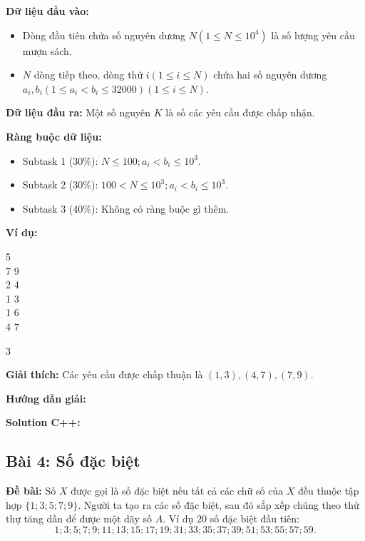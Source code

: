 \documentclass[12pt]{scrartcl}  %
\begin{document}
\textbf{Dữ liệu đầu vào:}
\begin{itemize}
    \item Dòng đầu tiên chứa số nguyên dương $N (1 \leq N \leq 10^4)$ là số lượng yêu cầu mượn sách.
    \item $N$ dòng tiếp theo, dòng thứ $i (1 \leq i \leq N)$ chứa hai số nguyên dương $a_i, b_i (1 \leq a_i < b_i \leq 32000) (1 \leq i \leq N)$. 
\end{itemize}

\textbf{Dữ liệu đầu ra:}
Một số nguyên $K$ là số các yêu cầu được chấp nhận. 

\textbf{Ràng buộc dữ liệu:}
\begin{itemize}
    \item Subtask 1 (30\%): $N \leq 100; a_i < b_i \le 10^3$.
    \item Subtask 2 (30\%): $100 < N \leq 10^3; a_i < b_i \leq 10^3$.
    \item Subtask 3 (40\%): Không có ràng buộc gì thêm.
\end{itemize}

\textbf{Ví dụ:}
\begin{tcolorbox}[colback=gray!5!white, colframe=blue!50!black, title=Input]
5\\
7 9\\
2 4\\
1 3\\
1 6\\
4 7
\end{tcolorbox}
\begin{tcolorbox}[colback=gray!5!white, colframe=green!50!black, title=Output]
3
\end{tcolorbox}

\textbf{Giải thích:}
Các yêu cầu được chấp thuận là $(1, 3), (4, 7), (7, 9)$.

\textbf{Hướng dẫn giải:}

\textbf{Solution C++:}

\subsection{Bài 4: Số đặc biệt}

\textbf{Đề bài:}
Số $X$ được gọi là số đặc biệt nếu tất cả các chữ số của $X$ đều thuộc tập hợp $\{1; 3; 5; 7; 9\}$. Người ta tạo ra các số đặc biệt, sau đó sắp xếp chúng theo thứ thự tăng dần để được một dãy số $A$. 
Ví dụ $20$ số đặc biệt đầu tiên:
$$1; 3; 5; 7; 9; 11; 13; 15; 17; 19; 31; 33; 35; 37; 39; 51; 53; 55; 57; 59.$$
\end{document}
